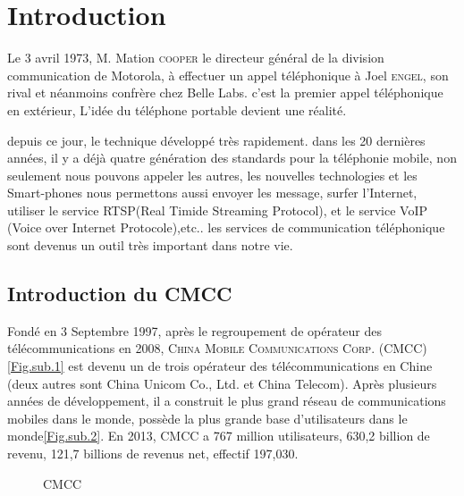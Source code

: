 
\section{Introduction} %
 
Le 3 avril 1973, M. Mation \textsc{cooper} le directeur général de la division communication de Motorola, à effectuer un appel téléphonique à Joel \textsc{engel}, son rival et néanmoins confrère chez \textsf{Belle Labs}. c'est la premier appel téléphonique en extérieur, L'idée du téléphone portable devient une réalité. 

depuis ce jour, le technique développé très rapidement. dans les 20 dernières années, il y a déjà quatre génération des standards pour la téléphonie mobile, non seulement nous pouvons appeler les autres, les nouvelles technologies et les Smart-phones nous permettons aussi envoyer les message, surfer l'Internet, utiliser le service RTSP(Real Timide Streaming Protocol), et le service VoIP (Voice over Internet Protocole),etc.. les services de communication téléphonique sont devenus un outil très important dans notre vie.
 
 \subsection{Introduction du CMCC}
 
Fondé en 3 Septembre 1997, après le regroupement de opérateur des télécommunications en 2008, \textsc{China Mobile Communications Corp.} (\textsf{CMCC})\ref{Fig.sub.1} est devenu un de trois opérateur des télécommunications en Chine (deux autres sont \textsf{China Unicom Co., Ltd.} et \textsf{China Telecom}). Après plusieurs années de développement, il a construit le plus grand réseau de communications mobiles dans le monde, possède la plus grande base d'utilisateurs dans le monde\ref{Fig.sub.2}. En 2013, CMCC a 767 million utilisateurs, 630,2 billion \textyen \qquad de revenu, 121,7 billions \textyen de revenus net, effectif 197,030.
\begin{figure}[H]
	\flushleft
	\hfill
	\hspace{1in}
	\caption{CMCC} 
\end{figure}


